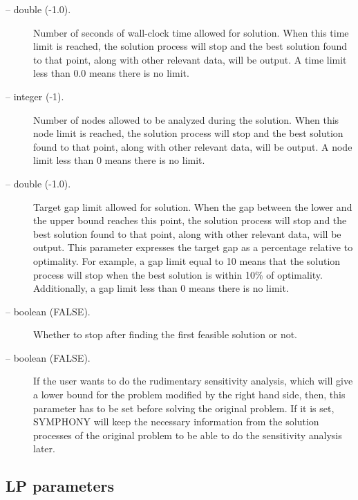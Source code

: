 \begin{description}
\item[ -- double (-1.0).] 
Number of seconds of wall-clock time allowed for solution. When this
time limit is reached, the solution process will stop and the best
solution found to that point, along with other relevant data, will be
output. A time limit less than 0.0 means there is no limit.

\item[ -- integer (-1).] 
Number of nodes allowed to be analyzed during the solution. When this
node limit is reached, the solution process will stop and the best
solution found to that point, along with other relevant data, will be
output. A node limit less than 0 means there is no limit. 

\item[ -- double (-1.0).] 
Target gap limit allowed for solution. When the gap between the lower and
the upper bound reaches this point, the solution process will stop and the
best solution found to that point, along with other relevant data, will be
output. This parameter expresses the target gap as a percentage relative to
optimality. For example, a gap limit equal to 10 means that the solution
process will stop when the best solution is within 10\% of optimality.
Additionally, a gap limit less than 0 means there is no limit.

\item[ -- boolean (FALSE).]
Whether to stop after finding the first feasible solution or not. 

\item[ -- boolean (FALSE).] 
If the user wants to do the rudimentary sensitivity analysis, which will 
give a lower bound for the problem modified by the right hand side, then, 
this parameter has to be set before solving the original problem. If it 
is set, SYMPHONY will keep the necessary information from the solution 
processes of the original problem to be able to do the sensitivity analysis 
later.  

\end{description}

\subsection{LP parameters}

